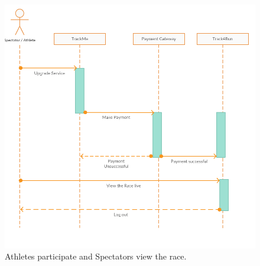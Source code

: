 \begin{figure}[H]
	\begin{center}
		\includegraphics[width=\textwidth]{./RASD_Sequence/7_AthleteSpectator.png}
      	\caption{Athletes participate and Spectators view the race.}
        \label{TrackMe_seq7}
	\end{center}
\end{figure}

